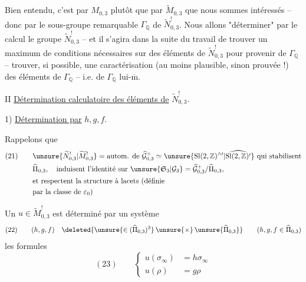 Bien entendu, c'est par $M_{0,3}$  plutôt que par $\widetilde M_{0,3}$  que nous sommes intéressés -- donc par le sous-groupe remarquable $\Gamma_{\mathbb Q}$ de $\widetilde N_{0,3}^{!}$. Nous allons "déterminer" par le calcul le groupe $\widetilde N_{0,3}^{!}$ -- et il s'agira dans la suite du travail de trouver un maximum de conditions nécessaires sur des éléments de $\widetilde N_{0,3}^{!}$ pour provenir de $\Gamma_{\mathbb Q}$ --  trouver, si possible, une caractérisation (au moins plausible, sinon prouvée !) des éléments de $\Gamma_{\mathbb Q}$ -- i.e. de $\Gamma_{\mathbb Q}$ lui-$\overline{\mathrm m}$.


II \uline{Détermination calculatoire des éléments de} $\widetilde N_{0,3}^{!}$.

1) \uline{Détermination par} $h,g,f$.


Rappelons que
\[
\begin{aligned}
(21)\qquad
&\unsure{\widetilde N_{0,3}^{!}|\widetilde M_{0,3}^{!}}
=\text{autom. de }\widehat{\mathcal G}_{0,3}^{+}
\simeq\unsure{\mathrm{Sl}(2,\mathbb Z)^{\wedge\prime}|\widehat{\mathrm{Sl}(2,\mathbb Z)^{\prime}}}
\text{ qui stabilisent}\\
&\widehat\Pi_{0,3},\quad\text{induisent l'identité sur }
\unsure{\mathfrak S_3|\mathcal G_3}
=\widehat{\mathcal G}_{0,3}^{+}/\widehat\Pi_{0,3},\\
&\text{et respectent la structure à lacets (définie}\\
&\text{par la classe de }\varepsilon_0\text{)}
\end{aligned}
\]

Un $u\in\widetilde M_{0,3}^{!}$ est déterminé par un système
\[
(22)\qquad (h,g,f)\quad
\deleted{\unsure{\in(\widehat{\Pi}_{0,3})^{3}}\,\unsure{\times}\,\unsure{\widehat{\Pi}_{0,3}}}
\qquad(h,g,f\in\widehat\Pi_{0,3})
\]
 les formules
\[
(23)\qquad
\left\{\begin{aligned}
u(\sigma_\infty)&=h\sigma_\infty\\
u(\rho)&=g\rho
\end{aligned}\right.
\]

